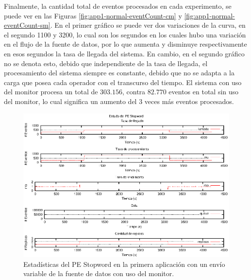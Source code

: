 Finalmente, la cantidad total de eventos procesados en cada experimento, se puede ver en las Figuras \ref{fig:app1-normal-eventCount-cm} y \ref{fig:app1-normal-eventCount-sm}. En el primer gráfico se puede ver dos variaciones de la curva, en el segundo 1100 y 3200, lo cual son los segundos en los cuales hubo una variación en el flujo de la fuente de datos, por lo que aumenta y disminuye respectivamente en esos segundos la tasa de llegada del sistema. En cambio, en el segundo gráfico no se denota esto, debido que independiente de la tasa de llegada, el procesamiento del sistema siempre es constante, debido que no se adapta a la carga que posea cada operador con el transcurso del tiempo. El sistema con uso del monitor procesa un total de $303.156$, contra $82.770$ eventos en total sin uso del monitor, lo cual significa un aumento del 3 veces más eventos procesados.

\begin{figure}[p]
\centering
    \includegraphics[scale=1.1]{images/exp/app1/normal/cm/statusStopwordPE.eps}
    \caption{Estadísticas del PE Stopword en la primera aplicación con un envío variable de la fuente de datos con uso del monitor.}
    \label{fig:app1-normal-statusStopwordPE-cm}
\end{figure}


